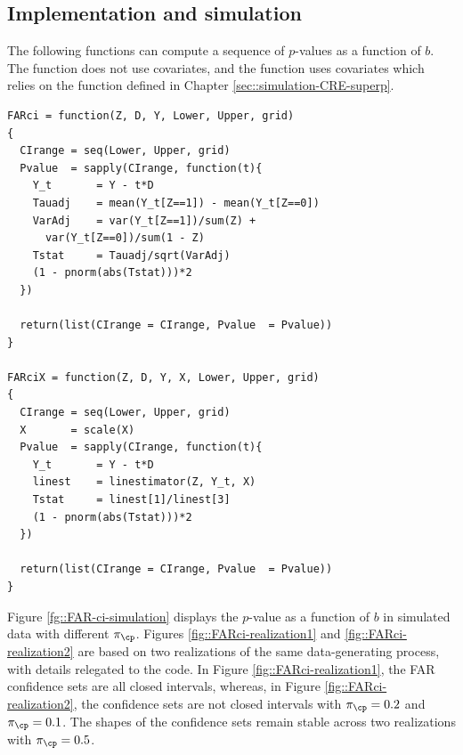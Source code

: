 \subsection{Implementation and simulation}\label{sec::FARci-simulation}


The following functions can compute a sequence of $p$-values as a function of $b$. The function  does not use covariates, and the function  uses covariates which relies on the function  defined in Chapter \ref{sec::simulation-CRE-superp}. 

\begin{lstlisting}
FARci = function(Z, D, Y, Lower, Upper, grid)
{
  CIrange = seq(Lower, Upper, grid)
  Pvalue  = sapply(CIrange, function(t){
    Y_t       = Y - t*D
    Tauadj    = mean(Y_t[Z==1]) - mean(Y_t[Z==0])
    VarAdj    = var(Y_t[Z==1])/sum(Z) + 
      var(Y_t[Z==0])/sum(1 - Z)
    Tstat     = Tauadj/sqrt(VarAdj)
    (1 - pnorm(abs(Tstat)))*2
  })
  
  return(list(CIrange = CIrange, Pvalue  = Pvalue))
}

FARciX = function(Z, D, Y, X, Lower, Upper, grid)
{
  CIrange = seq(Lower, Upper, grid)
  X       = scale(X)
  Pvalue  = sapply(CIrange, function(t){
    Y_t       = Y - t*D
    linest    = linestimator(Z, Y_t, X)
    Tstat     = linest[1]/linest[3]
    (1 - pnorm(abs(Tstat)))*2
  })
  
  return(list(CIrange = CIrange, Pvalue  = Pvalue))
}
\end{lstlisting}


Figure \ref{fg::FAR-ci-simulation} displays the $p$-value as a function of $b$ in simulated data with different $\pi_\cp$. Figures \ref{fig::FARci-realization1} and \ref{fig::FARci-realization2} are based on two realizations of the same data-generating process, with details relegated to the  code.  In Figure \ref{fig::FARci-realization1}, the FAR confidence sets are all closed intervals, whereas, in Figure \ref{fig::FARci-realization2}, the confidence sets are not closed intervals with $\pi_\cp = 0.2$ and $\pi_\cp = 0.1$. The shapes of the confidence sets remain stable across two realizations with $\pi_\cp = 0.5$. 



